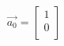 \documentclass[preview]{standalone}
\begin{document}
\begin{align*}
\vec{a_0} = [{\begin{array}{cc} 1 \\ 0 \\ \end{array}}]
\end{align*}
\end{document}
